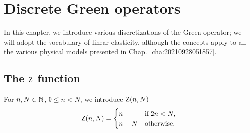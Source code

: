 \chapter{Discrete Green operators}

In this chapter, we introduce various discretizations of the Green operator; we
will adopt the vocabulary of linear elasticity, although the concepts apply to
all the various physical models presented in Chap.~\ref{cha:20210928051857}.

\section{The \(\operatorname{Z}\) function}
\label{sec:20210930055312}

For \(n, N\in\mathbb N\), \(0\leq n<N\), we introduce \(\operatorname{Z}(n, N)\)
\begin{equation}
  \operatorname{Z}(n, N)=
  \begin{cases}
    n & \text{if }2n<N,\\
    n-N & \text{otherwise.}
  \end{cases}
\end{equation}

